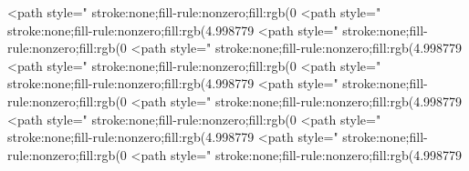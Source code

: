<path style=" stroke:none;fill-rule:nonzero;fill:rgb(0%
<path style=" stroke:none;fill-rule:nonzero;fill:rgb(4.998779%
<path style=" stroke:none;fill-rule:nonzero;fill:rgb(0%
<path style=" stroke:none;fill-rule:nonzero;fill:rgb(4.998779%
<path style=" stroke:none;fill-rule:nonzero;fill:rgb(0%
<path style=" stroke:none;fill-rule:nonzero;fill:rgb(4.998779%
<path style=" stroke:none;fill-rule:nonzero;fill:rgb(0%
<path style=" stroke:none;fill-rule:nonzero;fill:rgb(4.998779%
<path style=" stroke:none;fill-rule:nonzero;fill:rgb(0%
<path style=" stroke:none;fill-rule:nonzero;fill:rgb(4.998779%
<path style=" stroke:none;fill-rule:nonzero;fill:rgb(0%
<path style=" stroke:none;fill-rule:nonzero;fill:rgb(4.998779%
